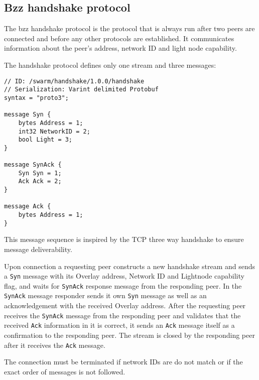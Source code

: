 \subsection{Bzz handshake protocol \statusgreen}\label{spec:protocol:bzz}

The bzz handshake protocol is the protocol that is always run after two peers are connected and before any other protocols are established. It communicates information about the  peer's address, network ID and light node capability.

The handshake protocol defines only one stream and three messages:

\begin{definition}\label{def:bzz-messages}

\begin{lstlisting}
// ID: /swarm/handshake/1.0.0/handshake
// Serialization: Varint delimited Protobuf
syntax = "proto3";

message Syn {
    bytes Address = 1;
    int32 NetworkID = 2;
    bool Light = 3;
}

message SynAck {
    Syn Syn = 1;
    Ack Ack = 2;
}

message Ack {
    bytes Address = 1;
}
\end{lstlisting}
\end{definition}

This message sequence is inspired by the TCP three way handshake to ensure message deliverability.

Upon connection a requesting peer constructs a new handshake stream and sends a \lstinline{Syn} message with its Overlay address, Network ID and Lightnode capability flag, and waits for \lstinline{SynAck} response message from the responding peer. In  the  \lstinline{SynAck} message responder sends it own \lstinline{Syn} message as well as an acknowledgement with the received Overlay address. After the requesting peer receives the \lstinline{SynAck} message from the responding peer and validates that the received \lstinline{Ack} information in it is correct, it sends an \lstinline{Ack} message itself as a confirmation to the responding peer. The stream is closed by the responding peer after it receives the \lstinline{Ack} message.

The connection must be terminated if network IDs are do not match or if the  exact  order of messages is not followed.

